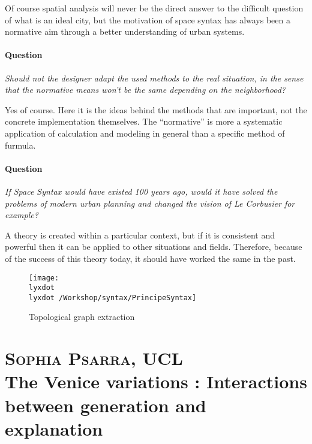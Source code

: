 \documentclass[english]{article}
\newcommand{\noun}[1]{\textsc{#1}}
\newcommand{\lyxdot}{.}
\begin{document}
\bigskip{}


Of course spatial analysis will never be the direct answer to the
difficult question of what is an ideal city, but the motivation of
space syntax has always been a normative aim through a better understanding
of urban systems.

\bigskip{}



\paragraph{Question}

\textit{Should not the designer adapt the used methods to the real
situation, in the sense that the normative means won't be the same
depending on the neighborhood?}

Yes of course. Here it is the ideas behind the methods that are important,
not the concrete implementation themselves. The ``normative'' is
more a systematic application of calculation and modeling in general
than a specific method of furmula. 

\bigskip{}



\paragraph{Question}

\textit{If Space Syntax would have existed 100 years ago, would it
have solved the problems of modern urban planning and changed the
vision of Le Corbusier for example?}

A theory is created within a particular context, but if it is consistent
and powerful then it can be applied to other situations and fields.
Therefore, because of the success of this theory today, it should
have worked the same in the past.

\begin{figure}
\texttt{[image: \\lyxdot \\lyxdot /Workshop/syntax/PrincipeSyntax]}

\caption{Topological graph extraction}
\end{figure}


\newpage{}


\section*{\noun{Sophia Psarra}, UCL\protect \\
The Venice variations : Interactions between generation and explanation}
\end{document}
